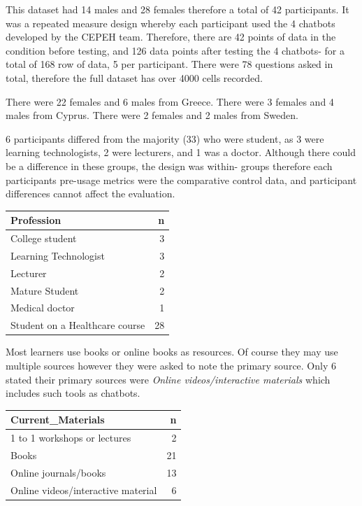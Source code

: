 \documentclass[a4paper, nobind]{templates/ociamthesis}
\begin{document}
This dataset had 14 males and 28 females therefore a total of 42 participants.
It was a repeated measure design whereby each participant used the 4 chatbots developed by the CEPEH team.
Therefore, there are 42 points of data in the condition before testing, and 126 data points after testing the 4 chatbots- for a total of 168 row of data, 5 per participant. There were 78 questions asked in total, therefore the full dataset has over 4000 cells recorded.

There were 22 females and 6 males from Greece.
There were 3 females and 4 males from Cyprus.
There were 2 females and 2 males from Sweden.

6 participants differed from the majority (33) who were student, as 3 were learning technologists, 2 were lecturers, and 1 was a doctor. Although there could be a difference in these groups, the design was within- groups therefore each participants pre-usage metrics were the comparative control data, and participant differences cannot affect the evaluation.

\begin{longtable}[]{@{}lr@{}}
\toprule()
Profession & n \\
\midrule()
\endhead
College student & 3 \\
Learning Technologist & 3 \\
Lecturer & 2 \\
Mature Student & 2 \\
Medical doctor & 1 \\
Student on a Healthcare course & 28 \\
\bottomrule()
\end{longtable}

Most learners use books or online books as resources. Of course they may use multiple sources however they were asked to note the primary source. Only 6 stated their primary sources were \emph{Online videos/interactive materials} which includes such tools as chatbots.

\begin{longtable}[]{@{}lr@{}}
\toprule()
Current\_Materials & n \\
\midrule()
\endhead
1 to 1 workshops or lectures & 2 \\
Books & 21 \\
Online journals/books & 13 \\
Online videos/interactive material & 6 \\
\bottomrule()
\end{longtable}
\end{document}
